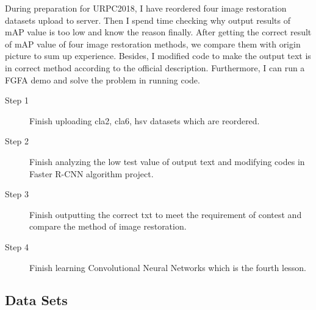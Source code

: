 \documentclass[a4paper]{article}
\begin{document}
During preparation for URPC2018, I have reordered four image restoration datasets upload to server. Then I spend time checking why output results of mAP value is too low and know the reason finally. After getting the correct result of mAP value of four image restoration methods, we compare them with origin picture to sum up experience. Besides, I modified code to make the output text is in correct method according to the official description. Furthermore, I can  run a FGFA demo and solve the problem in running code.  
\begin{description}
	\item [Step 1] Finish uploading cla2, cla6, hsv datasets which are reordered.
	\item[Step 2] Finish analyzing the low test value of output text and modifying codes in Faster R-CNN algorithm project.
	\item[Step 3] Finish outputting the correct txt to meet the requirement of contest and compare the method of image restoration.
	\item[Step 4] Finish learning Convolutional Neural Networks which is the fourth lesson.\label{t2}
\end{description}

\subsection{Data Sets}
\end{document}
